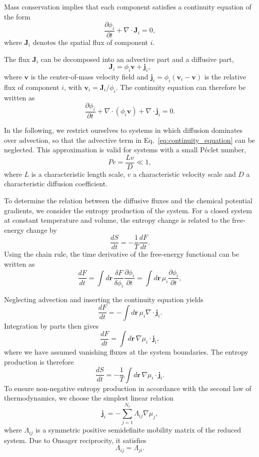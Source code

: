 \documentclass[12pt]{article}
\begin{document}
Mass conservation implies that each component satisfies a continuity equation of the form
\[
\frac{\partial \phi_i}{\partial t} + \nabla \cdot \boldsymbol{J}_i = 0,
\]
where \(\boldsymbol{J}_i\) denotes the spatial flux of component \(i\).

The flux \(\boldsymbol{J}_i\) can be decomposed into an advective part and a diffusive part,
\[
\boldsymbol{J}_i = \phi_i \boldsymbol{v} + \boldsymbol{j}_i,
\]
where \(\boldsymbol{v}\) is the center-of-mass velocity field and \(\boldsymbol{j}_i = \phi_i(\boldsymbol{v}_i-\boldsymbol{v})\) is the relative flux of component \(i\), with \(\boldsymbol{v}_i = \boldsymbol{J}_i/\phi_i\). The continuity equation can therefore be written as
\begin{equation}
\frac{\partial \phi_i}{\partial t} + \nabla \cdot (\phi_i \boldsymbol{v}) + \nabla \cdot \boldsymbol{j}_i = 0.
\label{eq:continuity_equation}
\end{equation}

In the following, we restrict ourselves to systems in which diffusion dominates over advection, so that the advective term in Eq.~\eqref{eq:continuity_equation} can be neglected. This approximation is valid for systems with a small Péclet number,
\[
Pe=\frac{Lv}{D}\ll 1,
\]
where \(L\) is a characteristic length scale, \(v\) a characteristic velocity scale and \(D\) a characteristic diffusion coefficient.

To determine the relation between the diffusive fluxes and the chemical potential gradients, we consider the entropy production of the system. For a closed system at constant temperature and volume, the entropy change is related to the free-energy change by
\[
\frac{dS}{dt} = -\frac{1}{T}\frac{dF}{dt}.
\]
Using the chain rule, the time derivative of the free-energy functional can be written as
\[
\frac{dF}{dt}
=
\int d\boldsymbol{r}\,
\frac{\delta F}{\delta \phi_i}
\frac{\partial \phi_i}{\partial t}
=
\int d\boldsymbol{r}\,
\mu_i
\frac{\partial \phi_i}{\partial t},
\]

Neglecting advection and inserting the continuity equation yields
\[
\frac{dF}{dt}
=
-\int d\boldsymbol{r}\,
\mu_i \nabla\cdot \boldsymbol{j}_i.
\]
Integration by parts then gives
\[
\frac{dF}{dt}
=
\int d\boldsymbol{r}\,
\nabla \mu_i \cdot \boldsymbol{j}_i,
\]
where we have assumed vanishing fluxes at the system boundaries. The entropy production is therefore
\[
\frac{dS}{dt}
=
-\frac{1}{T}
\int d\boldsymbol{r}\,
\nabla \mu_i \cdot \boldsymbol{j}_i.
\]
To ensure non-negative entropy production in accordance with the second law of thermodynamics, we choose the simplest linear relation
\begin{equation}
\boldsymbol{j}_i
=
-\sum_{j=1}^{N_c}
\Lambda_{ij}\nabla \mu_j,
\label{eq:flux_mobility}
\end{equation}
where \(\Lambda_{ij}\) is a symmetric positive semidefinite mobility matrix of the reduced system. Due to Onsager reciprocity, it satisfies
\[
\Lambda_{ij}=\Lambda_{ji}.
\]
\end{document}
